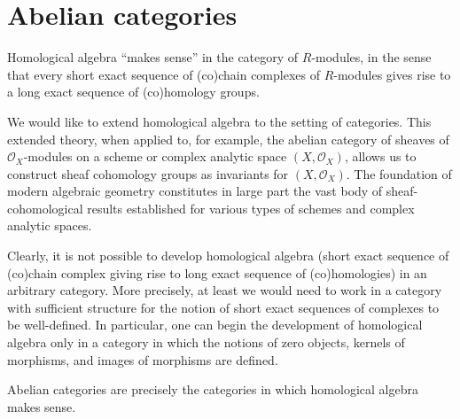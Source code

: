 

\section{Abelian categories}
\setcounter{theorem}{0}
\setcounter{equation}{0}


\renewcommand{\theenumi}{\roman{enumi}}
\renewcommand{\labelenumi}{\textnormal{(\theenumi)}$\;\;$}


Homological algebra ``makes sense'' in the category of $R$-modules,
in the sense that every short exact sequence of (co)chain complexes of $R$-modules
gives rise to a long exact sequence of (co)homology groups.

We would like to extend homological algebra to the setting of categories.
This extended theory, when applied to, for example,
the abelian category of sheaves of $\mathcal{O}_{X}$-modules
on a scheme or complex analytic space $(X,\mathcal{O}_{X})$,
allows us to construct sheaf cohomology groups as invariants for $(X,\mathcal{O}_{X})$.
The foundation of modern algebraic geometry constitutes in large part the vast body of sheaf-cohomological results established
for various types of schemes and complex analytic spaces.

Clearly, it is not possible to develop homological algebra
(short exact sequence of (co)chain complex giving rise to long exact sequence of (co)homologies)
in an arbitrary category.
More precisely, at least we would need to work in a category with sufficient structure
for the notion of short exact sequences of complexes to be well-defined.
In particular, one can begin the development of homological algebra only in a category
in which the notions of zero objects, kernels of morphisms, and images of morphisms are defined.

Abelian categories are precisely the categories in which homological algebra makes sense.


